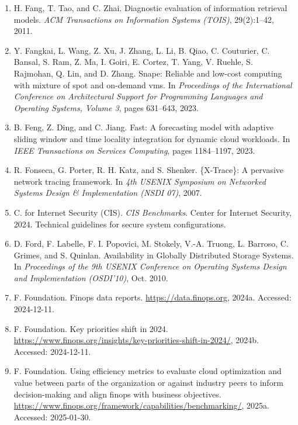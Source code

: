 \begin{enumerate}[leftmargin=2em,itemsep=2pt]
\item H. Fang, T. Tao, and C. Zhai. Diagnostic evaluation of information retrieval models. \textit{ACM Transactions on Information Systems (TOIS)}, 29(2):1--42, 2011.

\item Y. Fangkai, L. Wang, Z. Xu, J. Zhang, L. Li, B. Qiao, C. Couturier, C. Bansal, S. Ram, Z. Ma, I. Goiri, E. Cortez, T. Yang, V. Ruehle, S. Rajmohan, Q. Lin, and D. Zhang. Snape: Reliable and low-cost computing with mixture of spot and on-demand vms. In \textit{Proceedings of the International Conference on Architectural Support for Programming Languages and Operating Systems, Volume 3}, pages 631--643, 2023.

\item B. Feng, Z. Ding, and C. Jiang. Fast: A forecasting model with adaptive sliding window and time locality integration for dynamic cloud workloads. In \textit{IEEE Transactions on Services Computing}, pages 1184--1197, 2023.

\item R. Fonseca, G. Porter, R. H. Katz, and S. Shenker. \{X-Trace\}: A pervasive network tracing framework. In \textit{4th USENIX Symposium on Networked Systems Design \& Implementation (NSDI 07)}, 2007.

\item C. for Internet Security (CIS). \textit{CIS Benchmarks}. Center for Internet Security, 2024. Technical guidelines for secure system configurations.

\item D. Ford, F. Labelle, F. I. Popovici, M. Stokely, V.-A. Truong, L. Barroso, C. Grimes, and S. Quinlan. Availability in Globally Distributed Storage Systems. In \textit{Proceedings of the 9th USENIX Conference on Operating Systems Design and Implementation (OSDI'10)}, Oct. 2010.

\item F. Foundation. Finops data reports. \url{https://data.finops.org}, 2024a. Accessed: 2024-12-11.

\item F. Foundation. Key priorities shift in 2024. \url{https://www.finops.org/insights/key-priorities-shift-in-2024/}, 2024b. Accessed: 2024-12-11.

\item F. Foundation. Using efficiency metrics to evaluate cloud optimization and value between parts of the organization or against industry peers to inform decision-making and align finops with business objectives. \url{https://www.finops.org/framework/capabilities/benchmarking/}, 2025a. Accessed: 2025-01-30.


\end{enumerate}
